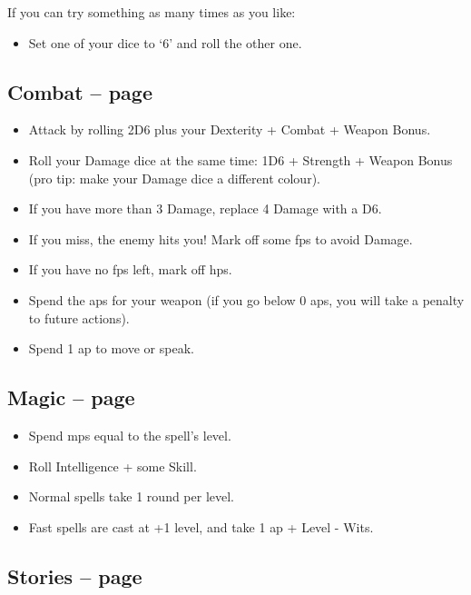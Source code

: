 \begin{multicols}{2}
If you can try something as many times as you like:

\begin{itemize}

  \item{Set one of your dice to `6' and roll the other one.}
  
\end{itemize}

\subsection{Combat -- page \pageref{attack}}

\begin{itemize}
  \item
  Attack by rolling 2D6 plus your Dexterity + Combat + Weapon Bonus.
  \item
  Roll your Damage dice at the same time: 1D6 + Strength + Weapon Bonus (pro tip: make your Damage dice a different colour).
  \item
  If you have more than 3 Damage, replace 4 Damage with a D6.
  \item
  If you miss, the enemy hits you!
  Mark off some \glspl{fp} to avoid Damage.
  \item
  If you have no \glspl{fp} left, mark off \glspl{hp}.
  \item
  Spend the \glspl{ap} for your weapon (if you go below 0 \glspl{ap}, you will take a penalty to future actions).
  \item
  Spend 1 \gls{ap} to move or speak.
\end{itemize}

\subsection{Magic -- page \pageref{basiccasting}}

\begin{itemize}

  \item
  Spend \glspl{mp} equal to the spell's level.
  \item
  Roll Intelligence + some Skill.
  \item
  Normal spells take 1 round per level.
  \item
  Fast spells are cast at +1 level, and take 1 \gls{ap} + Level - Wits.

\end{itemize}

\subsection{Stories -- page \pageref{stories}}


\end{multicols}
